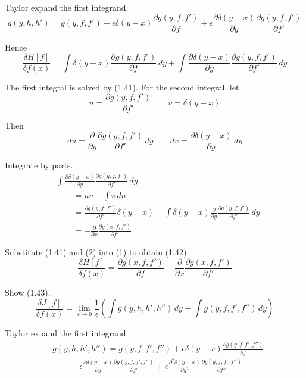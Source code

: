 \documentclass[12pt]{article}
\begin{document}
Taylor expand the first integrand.
\begin{equation*}
g(y,h,h')=g(y,f,f')
+\epsilon\delta(y-x)\frac{\partial g(y,f,f')}{\partial f}
+\epsilon\frac{\partial\delta(y-x)}{\partial y}\frac{\partial g(y,f,f')}{\partial f'}
\end{equation*}

Hence
\begin{equation*}
\frac{\delta H[f]}{\delta f(x)}
=\int\delta(y-x)\frac{\partial g(y,f,f')}{\partial f}\,dy
+\int\frac{\partial\delta(y-x)}{\partial y}\frac{\partial g(y,f,f')}{\partial f'}\,dy
\tag{1}
\end{equation*}

The first integral is solved by (1.41).
For the second integral, let
\begin{equation*}
u=\frac{\partial g(y,f,f')}{\partial f'}
\qquad
v=\delta(y-x)
\end{equation*}

Then
\begin{equation*}
du=\frac{\partial}{\partial y}\frac{\partial g(y,f,f')}{\partial f'}\,dy
\qquad
dv=\frac{\partial\delta(y-x)}{\partial y}\,dy
\end{equation*}

Integrate by parts.
\begin{align*}
&\int\frac{\partial\delta(y-x)}{\partial y}\frac{\partial g(y,f,f')}{\partial f'}\,dy
\\
&\qquad{}=uv-\int v\,du
\\
&\qquad{}=\frac{\partial g(y,f,f')}{\partial f'}\delta(y-x)
-\int\delta(y-x)\frac{\partial}{\partial y}\frac{\partial g(y,f,f')}{\partial f'}\,dy
\\
&\qquad{}=-\frac{\partial}{\partial x}\frac{\partial g(x,f,f')}{\partial f'}
\tag{2}
\end{align*}

Substitute (1.41) and (2) into (1) to obtain (1.42).
\begin{equation*}
\frac{\delta H[f]}{\delta f(x)}
=\frac{\partial g(x,f,f')}{\partial f}
-\frac{\partial}{\partial x}\frac{\partial g(x,f,f')}{\partial f'}
\end{equation*}

Show (1.43).
\begin{equation*}
\frac{\delta J[f]}{\delta f(x)}
=\lim_{\epsilon\rightarrow 0}\frac{1}{\epsilon}
\left(
\int g(y,h,h',h'')\,dy-\int g(y,f,f',f'')\,dy
\right)
\end{equation*}

Taylor expand the first integrand.
\begin{align*}
&g(y,h,h',h'')=g(y,f,f',f'')
+\epsilon\delta(y-x)\frac{\partial g(y,f,f',f'')}{\partial f}
\\
&\qquad{}+\epsilon\frac{\partial\delta(y-x)}{\partial y}\frac{\partial g(y,f,f',f'')}{\partial f'}
+\epsilon\frac{\partial^2\delta(y-x)}{\partial y^2}\frac{\partial g(y,f,f',f'')}{\partial f''}
\end{align*}
\end{document}
